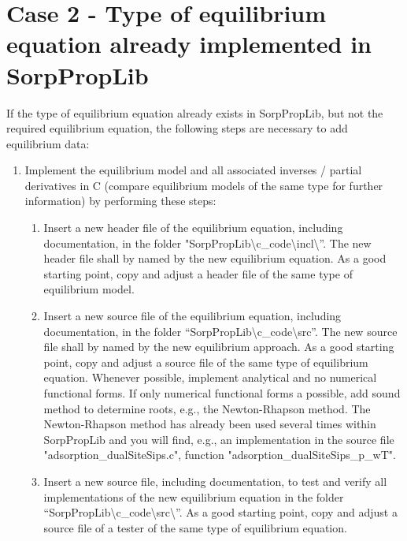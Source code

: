 \section{Case 2 - Type of equilibrium equation already implemented in SorpPropLib}
\label{cha:extensions:case2}
%
If the type of equilibrium equation already exists in SorpPropLib, but not the required equilibrium equation, the following steps are necessary to add equilibrium data:
\begin{enumerate}
	\item Implement the equilibrium model and all associated inverses / partial derivatives in C (compare equilibrium models of the same type for further information) by performing these steps:
	\begin{enumerate}
		\item Insert a new header file of the equilibrium equation, including documentation, in the folder "SorpPropLib\textbackslash c\_code\textbackslash incl\textbackslash”. The new header file shall by named by the new equilibrium equation. As a good starting point, copy and adjust a header file of the same type of equilibrium model.
		\item Insert a new source file of the equilibrium equation, including documentation, in the folder “SorpPropLib\textbackslash c\_code\textbackslash src”. The new source file shall by named by the new equilibrium approach. As a good starting point, copy and adjust a source file of the same type of equilibrium equation. Whenever possible, implement analytical and no numerical functional forms. If only numerical functional forms a possible, add sound method to determine roots, e.g., the Newton-Rhapson method. The Newton-Rhapson method has already been used several times within SorpPropLib and you will find, e.g., an implementation in the source file "adsorption\_dualSiteSips.c", function "adsorption\_dualSiteSips\_p\_wT".
		\item Insert a new source file, including documentation, to test and verify all implementations of the new equilibrium equation in the folder “SorpPropLib\textbackslash c\_code\textbackslash src\textbackslash ”. As a good starting point, copy and adjust a source file of a tester of the same type of equilibrium equation.

\end{enumerate}
\end{enumerate}
